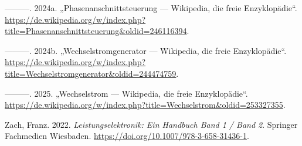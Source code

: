 \documentclass[
  ngerman,
  letterpaper,
]{scrbook}
\newlength{\cslhangindent}
\newenvironment{CSLReferences}[2] %
 {\begin{list}{}{%
  \setlength{\itemindent}{0pt}
  \setlength{\leftmargin}{0pt}
  \setlength{\parsep}{0pt}
  \ifodd #1
   \setlength{\leftmargin}{\cslhangindent}
   \setlength{\itemindent}{-1\cslhangindent}
  \fi
  \setlength{\itemsep}{#2\baselineskip}}}
 {\end{list}}
\begin{document}
\begin{CSLReferences}{1}{0}
---------. 2024a. {„Phasenanschnittsteuerung --- Wikipedia{,} die freie
Enzyklopädie``}.
\url{https://de.wikipedia.org/w/index.php?title=Phasenanschnittsteuerung&oldid=246116394}.

---------. 2024b. {„Wechselstromgenerator --- Wikipedia{,} die freie
Enzyklopädie``}.
\url{https://de.wikipedia.org/w/index.php?title=Wechselstromgenerator&oldid=244474759}.

---------. 2025. {„Wechselstrom --- Wikipedia{,} die freie
Enzyklopädie``}.
\url{https://de.wikipedia.org/w/index.php?title=Wechselstrom&oldid=253327355}.

Zach, Franz. 2022. \emph{Leistungselektronik: Ein Handbuch Band 1 / Band
2}. Springer Fachmedien Wiesbaden.
\url{https://doi.org/10.1007/978-3-658-31436-1}.

\end{CSLReferences}


\backmatter
\end{document}
